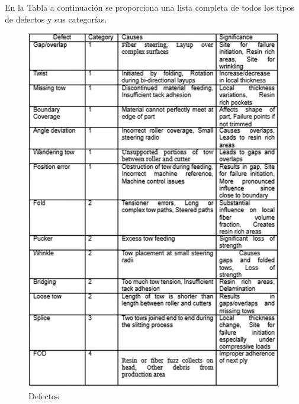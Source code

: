 En la Tabla a continuación se proporciona una lista completa de todos los tipos de defectos y sus categorías.

\begin{figure}[H]
    \centering
    \includegraphics[width=1\linewidth]{funf.png}
    \caption{Defectos}
    \label{fig:enter-label}
\end{figure}


\textbf{}